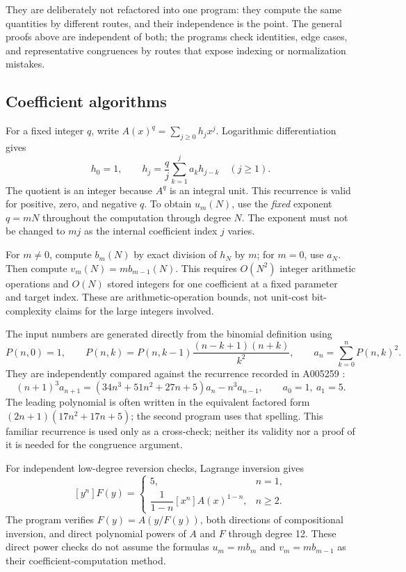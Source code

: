 \documentclass[11pt,letterpaper]{article}
\numberwithin{equation}{section}
\theoremstyle{definition}
\begin{document}
They are deliberately not refactored into one program: they compute the
same quantities by different routes, and their independence is the point.
The general proofs above are independent of both; the programs check
identities, edge cases, and representative congruences by routes that
expose indexing or normalization mistakes.

\subsection{Coefficient algorithms}

For a fixed integer $q$, write $A(x)^q=\sum_{j\geq0}h_jx^j$.
Logarithmic differentiation gives
\begin{equation}\label{eq:coefficient-recurrence}
h_0=1,\qquad
h_j=\frac qj\sum_{k=1}^j a_k h_{j-k}\quad(j\geq1).
\end{equation}
The quotient is an integer because $A^q$ is an integral unit. This
recurrence is valid for positive, zero, and negative $q$.
To obtain $u_m(N)$, use the \emph{fixed} exponent $q=mN$ throughout the
computation through degree $N$. The exponent must not be changed to
$mj$ as the internal coefficient index $j$ varies.

For $m\neq0$, compute $b_m(N)$ by exact division of $h_N$ by $m$;
for $m=0$, use $a_N$. Then compute $v_m(N)=m b_{m-1}(N)$.
This requires $O(N^2)$ integer arithmetic operations and $O(N)$ stored
integers for one coefficient at a fixed parameter and target index.
These are arithmetic-operation bounds, not unit-cost bit-complexity
claims for the large integers involved.

The input numbers are generated directly from the binomial definition
using
\[
P(n,0)=1,\qquad
P(n,k)=P(n,k-1)\frac{(n-k+1)(n+k)}{k^2},
\qquad a_n=\sum_{k=0}^nP(n,k)^2.
\]
They are independently compared against the recurrence recorded in
A005259 \cite{oeis-apery}:
\begin{equation}\label{eq:apery-recurrence}
(n+1)^3a_{n+1}
=(34n^3+51n^2+27n+5)a_n-n^3a_{n-1},
\qquad a_0=1,\ a_1=5.
\end{equation}
The leading polynomial is often written in the equivalent factored form
$(2n+1)(17n^2+17n+5)$; the second program uses that spelling.
This familiar recurrence is used only as a cross-check; neither its
validity nor a proof of it is needed for the congruence argument.

For independent low-degree reversion checks, Lagrange inversion gives
\[
[y^n]F(y)=
\begin{cases}
5,&n=1,\\[2pt]
\dfrac1{1-n}[x^n]A(x)^{1-n},&n\geq2.
\end{cases}
\]
The program verifies $F(y)=A(y/F(y))$, both directions of compositional
inversion, and direct polynomial powers of $A$ and $F$ through degree
12. These direct power checks do not assume the formulas $u_m=m b_m$
and $v_m=m b_{m-1}$ as their coefficient-computation method.
\end{document}
